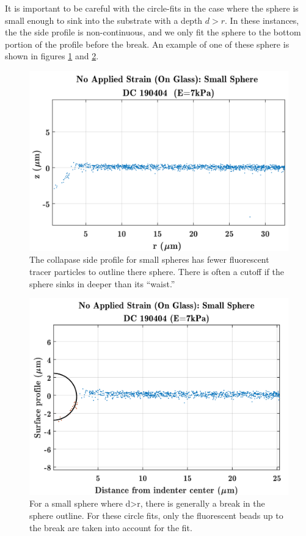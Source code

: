 It is important to be careful with the circle-fits in the case where the sphere is small enough to sink into the substrate with a depth $ d > r $. In these instances, the the side profile is non-continuous, and we only fit the sphere to the bottom portion of the profile before the break. An example of one of these sphere is shown in figures \ref{fig:smallsphere017190404dcglass} and \ref{fig:smallsphere017ciclefitspheredc}.
\begin{figure}[h!]
	\centering
	\includegraphics[width=\linewidth]{Chapters/Figures/smallsphere017_190404_DC_glass}
	\caption[Small Sphere Side Profile]{The collapase side profile for small spheres has fewer fluorescent tracer particles to outline there sphere. There is often a cutoff if the sphere sinks in deeper than its ``waist.''}
	\label{fig:smallsphere017190404dcglass}
\end{figure}
\begin{figure}[h!]
	\centering
	\includegraphics[width=\linewidth]{Chapters/Figures/smallsphere017_cicle_fitsphere_DC}
	\caption[Small Sphere Circle Fit]{For a small sphere where d>r, there is generally a break in the sphere outline. For these circle fits, only the fluorescent beads up to the break are taken into account for the fit.}
	\label{fig:smallsphere017ciclefitspheredc}
\end{figure}


